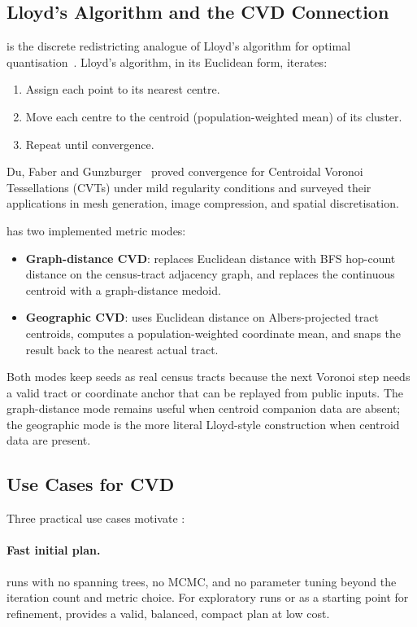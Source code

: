 \subsection{Lloyd's Algorithm and the CVD Connection}

\cvd{} is the discrete redistricting analogue of Lloyd's algorithm for
optimal quantisation~\citep{lloyd1982}.
Lloyd's algorithm, in its Euclidean form, iterates:
\begin{enumerate}
\item Assign each point to its nearest centre.
\item Move each centre to the centroid (population-weighted mean) of its cluster.
\item Repeat until convergence.
\end{enumerate}
Du, Faber and Gunzburger~\citeyear{du1999} proved convergence for Centroidal
Voronoi Tessellations (CVTs) under mild regularity conditions and surveyed their
applications in mesh generation, image compression, and spatial discretisation.

\cvd{} has two implemented metric modes:
\begin{itemize}
\item \textbf{Graph-distance CVD}: replaces Euclidean distance with BFS
  hop-count distance on the census-tract adjacency graph, and replaces the
  continuous centroid with a graph-distance medoid.
\item \textbf{Geographic CVD}: uses Euclidean distance on Albers-projected
  tract centroids, computes a population-weighted coordinate mean, and snaps
  the result back to the nearest actual tract.
\end{itemize}
Both modes keep seeds as real census tracts because the next Voronoi step needs
a valid tract or coordinate anchor that can be replayed from public inputs.
The graph-distance mode remains useful when centroid companion data are absent;
the geographic mode is the more literal Lloyd-style construction when centroid
data are present.

\subsection{Use Cases for CVD}

Three practical use cases motivate \cvd{}:

\paragraph{Fast initial plan.}
\cvd{} runs with no spanning trees, no MCMC, and no parameter tuning beyond
the iteration count and metric choice.
For exploratory runs or as a starting point for \sa{} refinement, \cvd{}
provides a valid, balanced, compact plan at low cost.

